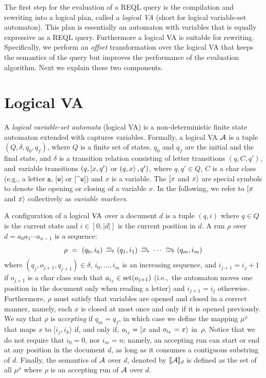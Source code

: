 
The first step for the evaluation of a REQL query is the compilation and
rewriting into a logical plan, called a \emph{logical VA} (short for logical
variable-set automaton). This plan is essentially an automaton with variables
that is equally expressive as a REQL query. Furthermore a logical VA is suitable
for rewriting. Specifically, we perform an \emph{offset} transformation over the
logical VA that keeps the semantics of the query but improves the performance of
the evaluation algorithm. Next we explain these two components. %

\section{Logical VA}

A \emph{logical variable-set automata} (logical VA) is a non-deterministic
finite state automaton extended with captures variables.
Formally, a logical VA $\mathcal{A}$ is a tuple $(Q, \delta, q_0, q_f)$, where $Q$ is a
finite set of states, $q_0$ and $q_f$ are the initial and the final state, and
$\delta$ is a transition relation consisting of letter transitions $(q, C, q')$,
and variable transitions $(q, [ x, q')$ or $(q, x \rangle\,,q')$, where $q,
q' \in Q$, $C$ is a char class (e.g., a letter $\texttt{a}$, $\texttt{[w]}$ or
$\texttt{[\textasciicircum w]}$) and $x$ is a variable. The $[ x$ and
$x \rangle$ are special symbols to denote the opening or closing of a variable
$x$. In the following, we refer to $[ x$ and $x \rangle$ collectively as
\emph{variable markers}.

A configuration of a logical $\mathrm{VA}$ over a document $d$ is a tuple $(q, i)$ where
$q \in Q$ is the current state and \(i \in [0, |d|]\) is the current position in
$d$. A run $\rho$ over $d = a_0 a_1 \cdots a_{n-1}$ is a sequence:
$$
	\rho \ = \ (q_0, i_0) \ \trans{o_1} \ (q_1, i_1) \ \trans{o_2} \ \cdots \ \trans{o_m} \ (q_m, i_m)
$$
where $(q_j, o_{j+1}, q_{j+1}) \in \delta$,  $i_0, \ldots, i_m$ is an increasing
sequence, and $i_{j+1} = i_j +1$ if $o_{j+1}$ is a char class such that $a_{i_j}
\in \operatorname{set}(o_{j+1})$   (i.e.,\ the automaton moves one position in the document
only when reading a letter) and $i_{j+1} = i_j$ otherwise. Furthermore, $\rho$
must satisfy that variables are opened and closed in a correct manner, namely,
each $x$ is closed at most once and only if it is opened previously. We say that
$\rho$ is \emph{accepting} if $q_m = q_f$, in which case we define the mapping
$\mu^{\rho}$ that maps $x$ to $[i_j, i_k\rangle$ if, and only if, $o_{i_j} =
[ x$ and $o_{i_k} = x \rangle$ in~$\rho$. Notice that we do not require
that $i_0 = 0$, nor $i_m=n$; namely, an accepting run can start or end at any
position in the document $d$, as long as it consumes a contiguous substring of
$d$. Finally, the semantics of $\mathcal{A}$ over $d$, denoted by \(\llbracket\mathcal{A}\rrbracket_{d}\) is
defined as the set of all $\mu^{\rho}$ where $\rho$ is an accepting run of $\mathcal{A}$
over $d$.

